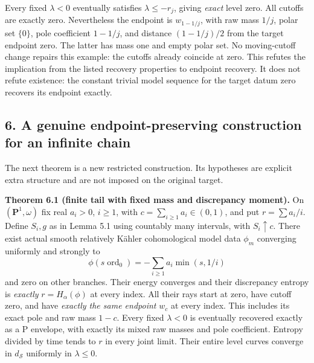 \documentclass[
  11pt,
]{article}
\begin{document}
Every fixed \(\lambda<0\) eventually satisfies \(\lambda\leq-r_j\),
giving \emph{exact} level zero. All cutoffs are exactly zero.
Nevertheless the endpoint is \(w_{1-1/j}\), with raw mass \(1/j\), polar
set \(\{0\}\), pole coefficient \(1-1/j\), and distance \((1-1/j)/2\)
from the target endpoint zero. The latter has mass one and empty polar
set. No moving-cutoff change repairs this example: the cutoffs already
coincide at zero. This refutes the implication from the listed recovery
properties to endpoint recovery. It does not refute existence: the
constant trivial model sequence for the target datum zero recovers its
endpoint exactly.

\subsection{6. A genuine endpoint-preserving construction for an
infinite
chain}\label{a-genuine-endpoint-preserving-construction-for-an-infinite-chain}

The next theorem is a new restricted construction. Its hypotheses are
explicit extra structure and are not imposed on the original target.

\textbf{Theorem 6.1 (finite tail with fixed mass and discrepancy
moment).} On \((\mathbf P^1,\omega)\) fix real \(a_i>0\), \(i\geq1\),
with \(c=\sum_{i\geq1}a_i\in(0,1)\), and put \(r=\sum a_i/i\). Define
\(S_i,g\) as in Lemma 5.1 using countably many intervals, with
\(S_i\uparrow c\). There exist actual smooth relatively Kähler
cohomological model data \(\phi_m\) converging uniformly and strongly to
\[ \phi(s\operatorname{ord}_0)=-\sum_{i\geq1}a_i\min(s,1/i)\] and zero
on other branches. Their energy converges and their discrepancy entropy
is \emph{exactly} \(r=H_\alpha(\phi)\) at every index. All their rays
start at zero, have cutoff zero, and have \emph{exactly the same
endpoint} \(w_c\) at every index. This includes its exact pole and raw
mass \(1-c\). Every fixed \(\lambda<0\) is eventually recovered exactly
as a P envelope, with exactly its mixed raw masses and pole coefficient.
Entropy divided by time tends to \(r\) in every joint limit. Their
entire level curves converge in \(d_{\mathcal S}\) uniformly in
\(\lambda\leq0\).
\end{document}
